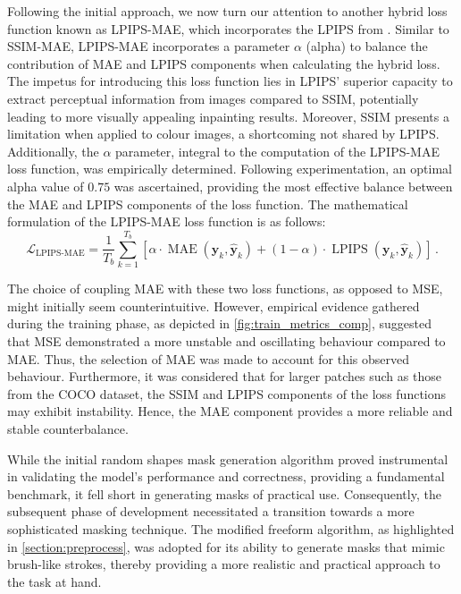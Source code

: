 Following the initial approach, we now turn our attention to another hybrid loss function known as LPIPS-MAE, which incorporates the LPIPS from \cite{lpips}. Similar to SSIM-MAE, LPIPS-MAE incorporates a parameter $\alpha$ (alpha) to balance the contribution of MAE and LPIPS components when calculating the hybrid loss. The impetus for introducing this loss function lies in LPIPS' superior capacity to extract perceptual information from images compared to SSIM, potentially leading to more visually appealing inpainting results. Moreover, SSIM presents a limitation when applied to colour images, a shortcoming not shared by LPIPS. Additionally, the $\alpha$ parameter, integral to the computation of the LPIPS-MAE loss function, was empirically determined. Following experimentation, an optimal alpha value of $0.75$ was ascertained, providing the most effective balance between the MAE and LPIPS components of the loss function. The mathematical formulation of the LPIPS-MAE loss function is as follows:
\begin{equation}
    \mathcal{L}_{\text{LPIPS-MAE}} = \dfrac{1}{T_b} \sum\limits_{k=1}^{T_b} \left[\alpha \cdot \operatorname{MAE}\left( \symbf{y}_k, \symbf{\hat{y}}_k \right) + \left(1 - \alpha \right) \cdot \operatorname{LPIPS}\left( \symbf{y}_k, \symbf{\hat{y}}_k \right) \right]\,.
\end{equation}

The choice of coupling MAE with these two loss functions, as opposed to MSE, might initially seem counterintuitive. However, empirical evidence gathered during the training phase, as depicted in \autoref{fig:train_metrics_comp}, suggested that MSE demonstrated a more unstable and oscillating behaviour compared to MAE. Thus, the selection of MAE was made to account for this observed behaviour. Furthermore, it was considered that for larger patches such as those from the COCO dataset, the SSIM and LPIPS components of the loss functions may exhibit instability. Hence, the MAE component provides a more reliable and stable counterbalance.

While the initial random shapes mask generation algorithm proved instrumental in validating the model's performance and correctness, providing a fundamental benchmark, it fell short in generating masks of practical use. Consequently, the subsequent phase of development necessitated a transition towards a more sophisticated masking technique. The modified freeform algorithm, as highlighted in \autoref{section:preprocess}, was adopted for its ability to generate masks that mimic brush-like strokes, thereby providing a more realistic and practical approach to the task at hand.

